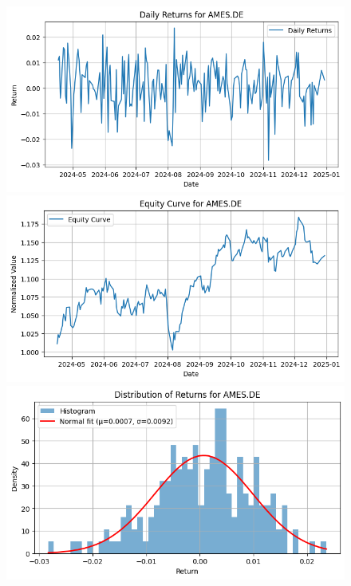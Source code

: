 \documentclass{article}%
\begin{document}
\begin{figure}[htbp]%
\begin{minipage}{0.31\textwidth}%
\includegraphics[width=\linewidth]{ticker_images/AMES.DE_daily_returns.png}%
\end{minipage}%
\begin{minipage}{0.31\textwidth}%
\includegraphics[width=\linewidth]{ticker_images/AMES.DE_equity_curve.png}%
\end{minipage}%
\begin{minipage}{0.31\textwidth}%
\includegraphics[width=\linewidth]{ticker_images/AMES.DE_return_distribution.png}%
\end{minipage}%
\end{figure}
\end{document}
